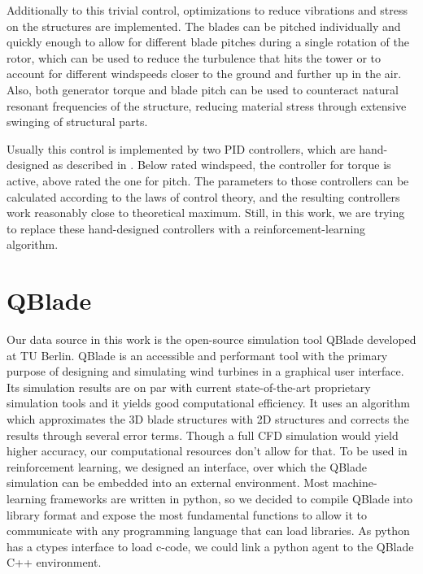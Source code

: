 \documentclass[hyperref,german,beleg]{cgvpub}
\begin{document}
Additionally to this trivial control, optimizations to reduce vibrations and stress on the structures are implemented. The blades can be pitched individually and quickly enough to allow for different blade pitches during a single rotation of the rotor, which can be used to reduce the turbulence that hits the tower or to account for different windspeeds closer to the ground and further up in the air. Also, both generator torque and blade pitch can be used to counteract natural resonant frequencies of the structure, reducing material stress through extensive swinging of structural parts.

Usually this control is implemented by two PID controllers, which are hand-designed as described in \cite[sec 8.4]{burtonWindEnergyHandbook2011}. Below rated windspeed, the controller for torque is active, above rated the one for pitch. The parameters to those controllers can be calculated according to the laws of control theory, and the resulting controllers work reasonably close to theoretical maximum. %
 Still, in this work, we are trying to replace these hand-designed controllers with a reinforcement-learning algorithm.


\section{QBlade}
Our data source in this work is the open-source simulation tool QBlade \cite{martenQBLADEOPENSOURCE2013} developed at TU Berlin. QBlade is an accessible and performant tool with the primary purpose of designing and simulating wind turbines in a graphical user interface. Its simulation results are on par with current state-of-the-art proprietary simulation tools and it yields good computational efficiency. It uses an algorithm which approximates the 3D blade structures with 2D structures and corrects the results through several error terms. Though a full CFD simulation would yield higher accuracy, our computational resources don't allow for that. To be used in reinforcement learning, we designed an interface, over which the QBlade simulation can be embedded into an external environment. Most machine-learning frameworks are written in python, so we decided to compile QBlade into library format and expose the most fundamental functions to allow it to communicate with any programming language that can load libraries. As python has a ctypes interface to load c-code, we could link a python agent to the QBlade C++ environment.
\end{document}
